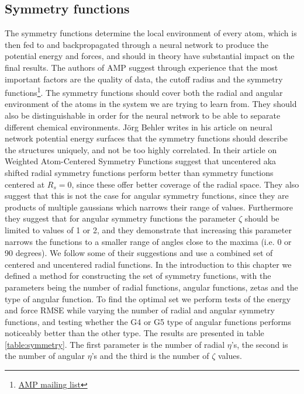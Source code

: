 \subsection{Symmetry functions}\label{chap:symmetry-functions}
The symmetry functions determine the local environment of every atom,
which is then fed to and backpropagated through a neural network
to produce the potential energy and forces,
and should in theory have substantial impact on the final results.
The authors of AMP suggest through experience that the most important
factors are the quality of data, the cutoff radius and the symmetry functions\footnote{
    \href{https://listserv.brown.edu/cgi-bin/wa?A2=AMP-USERS;52062bd3.1810}{
        AMP mailing list}}.
The symmetry functions should cover both the radial and angular
environment of the atoms in the system we are trying to learn from.
They should also be distinguishable in order for the neural network
to be able to separate different chemical environments.
J{\"o}rg Behler writes in his article on neural network potential
energy surfaces \parencite[Behler]{behler2011neural}
that the symmetry functions should describe the structures uniquely,
and not be too highly correlated.
In their article on Weighted Atom-Centered Symmetry Functions
\parencite[Gastegger et al.]{gastegger2018wacsf} suggest that uncentered
aka shifted radial symmetry functions perform better than symmetry functions
centered at $R_s = 0$, since these offer better coverage of the radial space.
They also suggest that this is not the case for angular symmetry functions,
since they are products of multiple gaussians which narrows their range
of values. 
Furthermore they suggest that for angular symmetry functions
the parameter $\zeta$ should be limited to values of 1 or 2,
and they demonstrate that increasing this parameter narrows
the functions to a smaller range of angles close to the maxima
(i.e. 0 or 90 degrees).
We follow some of their suggestions and use a combined set of
centered and uncentered radial functions. 
In the introduction to this chapter we defined a method
for constructing the set of symmetry functions, with the parameters
being the number of radial functions, angular functions, zetas
and the type of angular function.
To find the optimal set
we perform tests of the energy and force RMSE while varying the
number of radial and angular symmetry functions, and testing
whether the G4 or G5 type of angular functions performs noticeably
better than the other type.
The results are presented in table \ref{table:symmetry}.
The first parameter is the number of radial $\eta$'s,
the second is the number of angular $\eta$'s and the third
is the number of $\zeta$ values.

